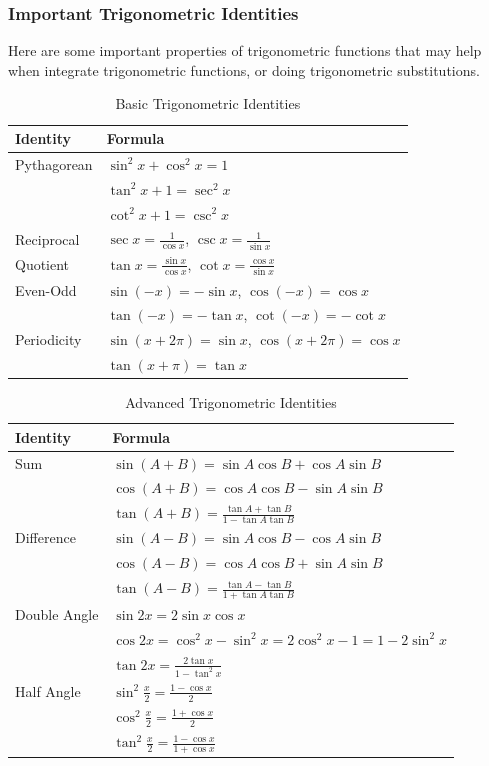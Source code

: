 \subsubsection{Important Trigonometric Identities}

Here are some important properties of trigonometric functions that may help when integrate trigonometric functions, or doing trigonometric substitutions.
\begin{table}[H]
\centering
\begin{tabular}{@{}ll@{}}
\toprule
Identity & Formula \\
\midrule
Pythagorean & $\sin^2 x + \cos^2 x = 1$ \\
 & $\tan^2 x + 1 = \sec^2 x$ \\
 & $\cot^2 x + 1 = \csc^2 x$ \\
\midrule
Reciprocal & $\sec x = \frac{1}{\cos x}$, $\csc x = \frac{1}{\sin x}$ \\
\midrule
Quotient & $\tan x = \frac{\sin x}{\cos x}$, $\cot x = \frac{\cos x}{\sin x}$ \\
\midrule
Even-Odd & $\sin(-x) = -\sin x$, $\cos(-x) = \cos x$ \\
 & $\tan(-x) = -\tan x$, $\cot(-x) = -\cot x$ \\
\midrule
Periodicity & $\sin(x + 2\pi) = \sin x$, $\cos(x + 2\pi) = \cos x$ \\
 & $\tan(x + \pi) = \tan x$ \\
\bottomrule
\end{tabular}
\caption{Basic Trigonometric Identities}
\label{tab:basic_trig_identities}
\end{table}

\begin{table}[h]
\centering
\begin{tabular}{@{}ll@{}}
\toprule
Identity & Formula \\
\midrule
Sum & $\sin(A + B) = \sin A \cos B + \cos A \sin B$ \\
 & $\cos(A + B) = \cos A \cos B - \sin A \sin B$ \\
 & $\tan(A + B) = \frac{\tan A + \tan B}{1 - \tan A \tan B}$ \\
\midrule
Difference & $\sin(A - B) = \sin A \cos B - \cos A \sin B$ \\
 & $\cos(A - B) = \cos A \cos B + \sin A \sin B$ \\
 & $\tan(A - B) = \frac{\tan A - \tan B}{1 + \tan A \tan B}$ \\
\midrule
Double Angle & $\sin 2x = 2\sin x \cos x$ \\
 & $\cos 2x = \cos^2 x - \sin^2 x = 2\cos^2 x - 1 = 1 - 2\sin^2 x$ \\
 & $\tan 2x = \frac{2\tan x}{1 - \tan^2 x}$ \\
\midrule
Half Angle & $\sin^2 \frac{x}{2} = \frac{1 - \cos x}{2}$ \\
 & $\cos^2 \frac{x}{2} = \frac{1 + \cos x}{2}$ \\
 & $\tan^2 \frac{x}{2} = \frac{1 - \cos x}{1 + \cos x}$ \\
\bottomrule
\end{tabular}
\caption{Advanced Trigonometric Identities}
\label{tab:advanced_trig_identities}
\end{table}

